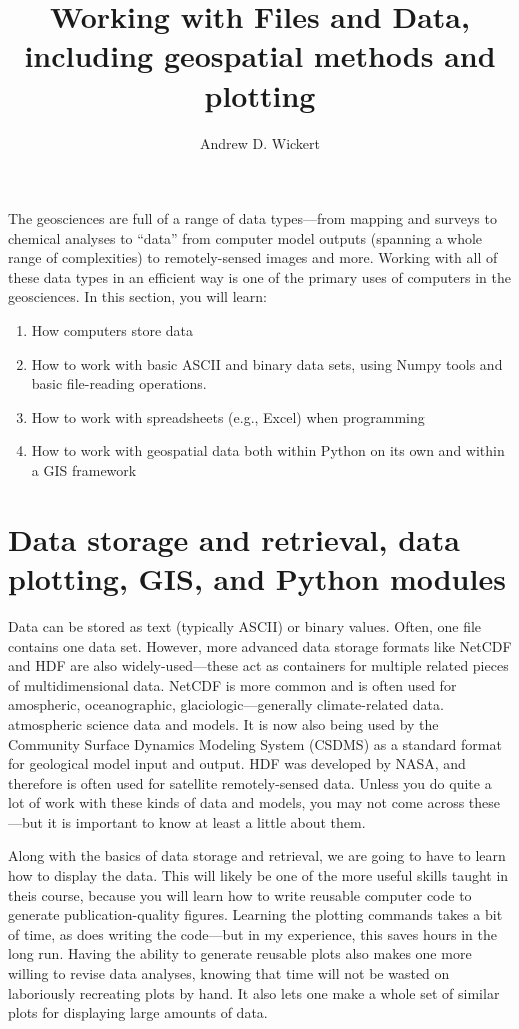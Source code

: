 \documentclass[a4paper,10pt]{scrartcl}
\title{Working with Files and Data, including geospatial methods and plotting}
\author{Andrew D. Wickert}
\begin{document}
\maketitle

The geosciences are full of a range of data types---from mapping and surveys to chemical analyses to ``data'' from computer model outputs (spanning a whole range of complexities) to remotely-sensed images and more. Working with all of these data types in an efficient way is one of the primary uses of computers in the geosciences. In this section, you will learn:

\begin{enumerate}
 \item How computers store data
 \item How to work with basic ASCII and binary data sets, using Numpy tools and basic file-reading operations.
 \item How to work with spreadsheets (e.g., Excel) when programming
 \item How to work with geospatial data both within Python on its own and within a GIS framework
\end{enumerate}

\section{Data storage and retrieval, data plotting, GIS, and Python modules}

Data can be stored as text (typically ASCII) or binary values. Often, one file contains one data set. However, more advanced data storage formats like NetCDF and HDF are also widely-used---these act as containers for multiple related pieces of multidimensional data. NetCDF is more common and is often used for amospheric, oceanographic, glaciologic---generally climate-related data. atmospheric science data and models. It is now also being used by the Community Surface Dynamics Modeling System (CSDMS) as a standard format for geological model input and output. HDF was developed by NASA, and therefore is often used for satellite remotely-sensed data. Unless you do quite a lot of work with these kinds of data and models, you may not come across these---but it is important to know at least a little about them.

Along with the basics of data storage and retrieval, we are going to have to learn how to display the data. This will likely be one of the more useful skills taught in theis course, because you will learn how to write reusable computer code to generate publication-quality figures. Learning the plotting commands takes a bit of time, as does writing the code---but in my experience, this saves hours in the long run. Having the ability to generate reusable plots also makes one more willing to revise data analyses, knowing that time will not be wasted on laboriously recreating plots by hand. It also lets one make a whole set of similar plots for displaying large amounts of data.
\end{document}
